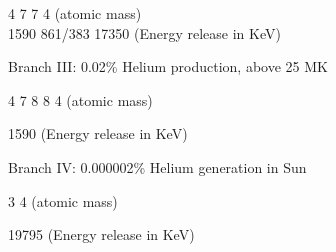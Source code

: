  \begin{center}
 \end{center}
 \vspace{-2mm}
 \hspace{6.5cm} {\scriptsize 4 \hspace{0.9cm} 7 \hspace{0.9cm} 7 \hspace{1.1cm} 4  \hfill (atomic mass) \\
 	\vspace{-3mm}
 	\hspace{6.8cm} 1590 \hspace{0.3cm} 861/383 \hspace{0.3cm} 17350 \hspace{0.9cm} \hfill (Energy release in KeV)}
 
 
 \vspace{4cm}
 
 \hspace{3cm} Branch III: 0.02\% Helium production, above 25 MK
 
 \begin{center}
 \end{center}
 \vspace{-2mm}
 \hspace{5.6cm} {\scriptsize 4 \hspace{0.8cm} 7 \hspace{0.9cm} 8 \hspace{1.0cm} 8 \hspace{1.0cm} 4   \hfill (atomic mass) \\
 	\vspace{-2mm}
 	
 	\hspace{5.5cm} 1590 \hspace{0.3cm}  \hfill (Energy release in KeV)}
 
 \vspace{1cm}
 
 
 \hspace{3cm} Branch IV: 0.000002\% Helium generation in Sun 
 
 \begin{center}
 \end{center}
 \vspace{-2mm}
 \hspace{7.8cm} {\scriptsize 3 \hspace{0.9cm} 4   \hfill (atomic mass) \\
 	\vspace{-2mm}
 	
 	\hspace{7.6cm} 19795 \hspace{0.3cm}  \hfill (Energy release in KeV)}
 
